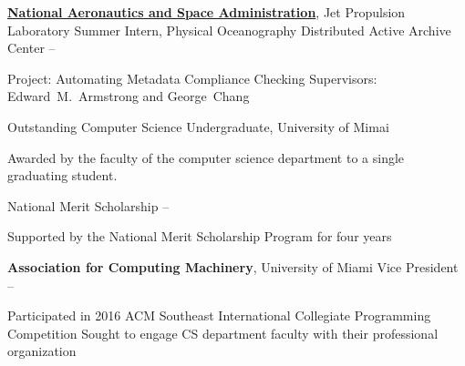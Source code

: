\documentclass[letterpaper,MMMyyyy,nonstopmode]{simpleresumecv}
\begin{document}
\begin{Body}
\Entry
\href{http://www.jpl.nasa.gov/}{\textbf{National Aeronautics and Space Administration}},
Jet Propulsion Laboratory
\Gap
\BulletItem Summer Intern, Physical Oceanography Distributed Active Archive Center
\hfill
{} -- 
\begin{Detail}
\SubBulletItem
Project: Automating Metadata Compliance Checking
\SubBulletItem
Supervisors: Edward~M.~Armstrong and George~Chang
\end{Detail}



\nocite{*}

\Gap
{}
\Gap
\printbibliography[heading=none,type=article]

\Gap
{}
\Gap
\printbibliography[heading=none,type=inproceedings]



\Gap
\BulletItem Outstanding Computer Science Undergraduate, University of Mimai
\hfill
{}
\begin{Detail}
\Item Awarded by the faculty of the computer science department to a single graduating student.
\end{Detail}

\Gap
\BulletItem National Merit Scholarship
\hfill
{} -- 
\begin{Detail}
\Item Supported by the National Merit Scholarship Program for four years
\end{Detail}



\Entry
\textbf{Association for Computing Machinery}, University of Miami
\Gap
\BulletItem Vice President
\hfill {} -- 
\begin{Detail}
\SubBulletItem Participated in 2016 ACM Southeast International Collegiate Programming Competition
\SubBulletItem Sought to engage CS department faculty with their professional organization
\end{Detail}


\end{Body}
\end{document}
